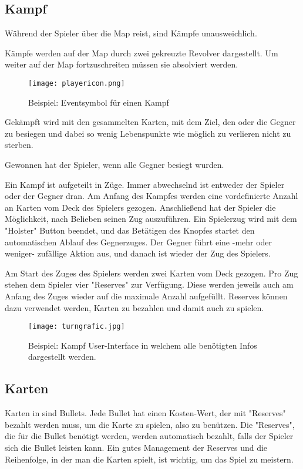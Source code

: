 \subsection{Kampf}\label{backpack_and_deck}

Während der Spieler über die Map reist, sind Kämpfe unausweichlich.


Kämpfe werden auf der Map durch zwei gekreuzte Revolver dargestellt. Um weiter auf der Map fortzuschreiten müssen sie absolviert werden.

\begin{figure}[H]
    \texttt{[image: playericon.png]}
    \caption{Beispiel: Eventsymbol für einen Kampf}
\end{figure}

Gekämpft wird mit den gesammelten Karten, mit dem Ziel, den oder die Gegner zu besiegen und dabei so wenig Lebenspunkte
wie möglich zu verlieren \bzw nicht zu sterben.

Gewonnen hat der Spieler, wenn alle Gegner besiegt wurden.


Ein Kampf ist aufgeteilt in Züge. Immer abwechselnd ist entweder der Spieler oder der Gegner dran. Am Anfang des Kampfes
werden eine vordefinierte Anzahl an Karten vom Deck des Spielers gezogen.
Anschließend hat der Spieler die Möglichkeit, nach Belieben seinen Zug auszuführen. Ein Spielerzug wird mit dem "Holster"
Button beendet, und das Betätigen des Knopfes startet den automatischen Ablauf des Gegnerzuges. Der Gegner führt eine -mehr
oder weniger- zufällige Aktion aus, und danach ist wieder der Zug des Spielers.


Am Start des Zuges des Spielers werden zwei Karten vom Deck gezogen. Pro Zug stehen dem Spieler vier "Reserves"
zur Verfügung. Diese werden jeweils auch am Anfang des Zuges wieder auf die maximale Anzahl aufgefüllt.
Reserves können dazu verwendet werden, Karten zu bezahlen und damit auch zu spielen.

\begin{figure}[H]
    \texttt{[image: turngrafic.jpg]}
    \caption{Beispiel: Kampf User-Interface in welchem alle benötigten Infos dargestellt werden.}
\end{figure}



\subsection{Karten}\label{Karten}
Karten in \FF sind Bullets. Jede Bullet hat einen Kosten-Wert, der mit "Reserves" bezahlt werden muss, um die Karte zu spielen, also zu benützen.
Die "Reserves", die für die Bullet benötigt werden, werden automatisch bezahlt, falls der Spieler sich die Bullet leisten kann.
Ein gutes Management der Reserves und die Reihenfolge, in der man die Karten spielt, ist wichtig, um das Spiel zu meistern.


